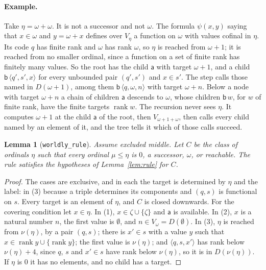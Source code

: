 \documentclass[10pt]{article}
\newtheorem{lemma}[theorem]{Lemma}
\theoremstyle{definition}
\theoremstyle{remark}
\newcommand{\rk}{\operatorname{rank}}
\newcommand{\la}{\mathsf{a}}
\newcommand{\lb}{\mathsf{b}}
\newcommand{\lean}[1]{\texttt{#1}}
\begin{document}
\paragraph{Example.}
Take $\eta=\omega+\omega$. It is not a successor and not $\omega$. The formula
$\psi(x,y)$ saying that $x\in\omega$ and $y=\omega+x$ defines over $V_\eta$ a function
on $\omega$ with values cofinal in $\eta$. Its code $q$ has finite rank and
$\omega$ has rank $\omega$, so $\eta$ is reached from $\omega+1$; it is reached from no
smaller ordinal, since a function on a set of finite rank has finitely
many values. So the root has the child $\la$ with target $\omega+1$, and a
child $\lb\,\langle q',s',x\rangle$ for every unbounded pair $(q',s')$ and $x\in s'$. The
step calls those named in $D(\omega+1)$, among them $\lb\,\langle q,\omega,n\rangle$ with
target $\omega+n$. Below a node with target $\omega+n$ a chain of children $\la$
descends to $\omega$, whose children $\lb\,w$, for $w$ of finite rank, have the
finite targets $\rk w$. The
recursion never sees $\eta$. It computes $\omega+1$ at the child $\la$ of the
root, then $V_{\omega+1+\omega}$, then calls every child named by an element of
it, and the tree tells it which of those calls succeed.

\begin{lemma}[\lean{worldly\_rule}]\label{lem:worldlyrule}
Assume excluded middle. Let $C$ be the class of ordinals $\eta$ such that
every ordinal $\mu\le\eta$ is $0$, a successor, $\omega$, or reachable. The rule
satisfies the hypotheses of Lemma~\ref{lem:rule} for $C$.
\end{lemma}
\begin{proof}
The cases are exclusive, and in each the target is determined by $\eta$
and the label: in (3) because a triple determines its components and
$(q,s)$ is functional on $s$. Every target is an element of $\eta$, and
$C$ is closed downwards. For the covering condition let $x\in\eta$. In (1),
$x\in\zeta\cup\{\zeta\}$ and $\la$ is available. In (2), $x$ is a natural number
$n$, the first value is $\emptyset$, and $n\in V_\omega=D(\emptyset)$. In (3),
$\eta$ is reached from $\nu(\eta)$, by a pair $(q,s)$; there is $x'\in s$ with a
value $y$ such that $x\in\rk y\cup\{\rk y\}$; the first value is $\nu(\eta)$; and
$\langle q,s,x'\rangle$ has rank below $\nu(\eta)+4$, since $q$, $s$ and $x'\in s$ have
rank below $\nu(\eta)$, so it is in $D(\nu(\eta))$. If $\eta$ is $0$ it has no
elements, and no child has a target.
\end{proof}
\end{document}
